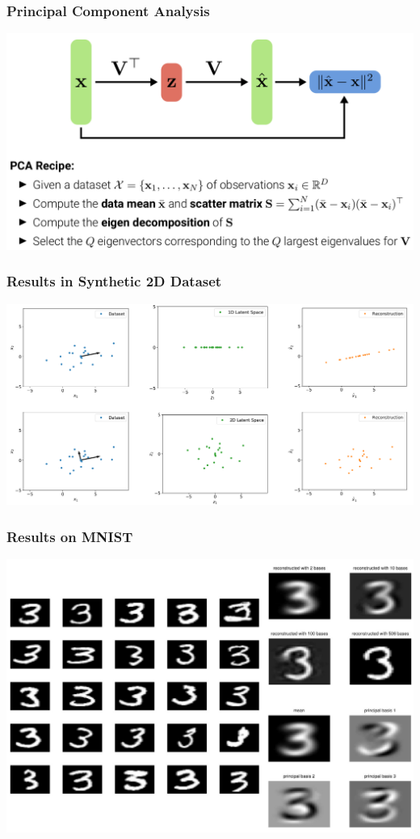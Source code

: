 \documentclass[10pt,aspectratio=169]{beamer}
\begin{document}
\begin{frame}
  \frametitle{Principal Component Analysis}
\begin{center}
\includegraphics[width=.9\textwidth]{images/s9}
\end{center}
\end{frame}


\begin{frame}
  \frametitle{Results in Synthetic 2D Dataset}
\begin{center}
\includegraphics[width=.95\textwidth]{images/s11}
\end{center}
\end{frame}


\begin{frame}
  \frametitle{Results on MNIST}
\begin{center}
\includegraphics[width=.7\textwidth]{images/s12}
\end{center}
\end{frame}
\end{document}
